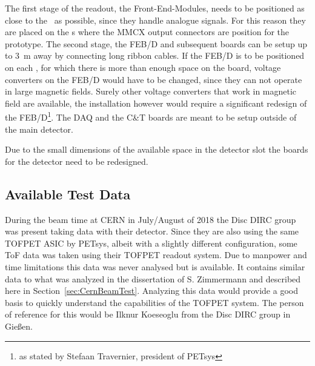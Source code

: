 \documentclass[../BTOF_summary.tex]{subfiles}
\begin{document}
The first stage of the readout, the Front-End-Modules, needs to be positioned as close to the \sipms\ as possible, since they handle analogue signals.
For this reason they are placed on the \railboard s where the MMCX output connectors are position for the prototype.
The second stage, the FEB/D and subsequent boards can be setup up to \SI{3}{m} away by connecting long ribbon cables.
If the FEB/D is to be positioned on each \sm , for which there is more than enough space on the board, voltage converters on the FEB/D would have to be changed, since they can not operate in large magnetic fields.
Surely other voltage converters that work in magnetic field are available, the installation however would require a significant redesign of the FEB/D\footnote{as stated by Stefaan Travernier, president of PETsys}.
The DAQ and the C\&T boards are meant to be setup outside of the main detector.

Due to the small dimensions of the available space in the detector slot the boards for the detector need to be redesigned.

\subsection{Available Test Data}

During the beam time at CERN in July/August of 2018 the Disc DIRC group was present taking data with their detector.
Since they are also using the same TOFPET ASIC by PETsys, albeit with a slightly different configuration, some ToF data was taken using their TOFPET readout system.
Due to manpower and time limitations this data was never analysed but is available.
It contains similar data to what was analyzed in the dissertation of S. Zimmermann and described here in Section~\ref{sec:CernBeamTest}.
Analyzing this data would provide a good basis to quickly understand the capabilities of the TOFPET system.
The person of reference for this would be Ilknur Koeseoglu from the Disc DIRC group in Gießen.
\end{document}

